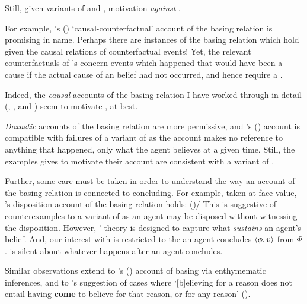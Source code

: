 \begin{note}
{    Still, given variants of \qWhy{} and \qHow{}, motivation \emph{against} \issueInclusion{}.

    For example, \citeauthor{Swain:1981wd}'s (\citeyear{Swain:1981wd}) `causal-counterfactual' account of the basing relation is promising in name.
    Perhaps there are instances of the basing relation which hold given the causal relations of counterfactual events!
    Yet, the relevant counterfactuals of \citeauthor{Swain:1981wd}'s concern events which happened that would have been a cause if the actual cause of an \agents{} belief had not occurred, and hence require a .

    Indeed, the \emph{causal} accounts of the basing relation I have worked through in detail (\cite{Moser:1989tv}, \cite{Ye:2020ux}, and \cite{Turri:2011aa}) seem to motivate \issueInclusion{}, at best.

    \emph{Doxastic} accounts of the basing relation are more permissive, and \citeauthor{Tolliver:1982us}'s (\citeyear{Tolliver:1982us}) account is compatible with failures of a variant of \issueInclusion{} as the account makes no reference to anything that happened, only what the agent believes at a given time.
    Still, the examples \citeauthor{Tolliver:1982us} gives to motivate their account are consistent with a variant of \issueInclusion{}.

    Further, some care must be taken in order to understand the way an account of the basing relation is connected to concluding.
    For example, taken at face value, \citeauthor{Evans:2013tw}'s disposition account of the basing relation holds:
     (\citeyear[2952]{Evans:2013tw})/
  This is suggestive of counterexamples to a variant of \issueInclusion{} as an agent may be disposed without witnessing the disposition.
  However, \citeauthor{Evans:2013tw}' theory is designed to capture what \emph{sustains} an agent's belief.%
  And, our interest with \issueInclusion{} is restricted to the  an agent concludes \(\langle\phi, v\rangle\) from \(\Phi\).
  \issueInclusion{} is silent about whatever happens after an agent concludes.

  Similar observations extend to \citeauthor{Moretti:2019wx}'s (\citeyear{Moretti:2019wx}) account of basing via enthymematic inferences, and to  \citeauthor{Audi:1986to}'s suggestion of cases where `[b]elieving for a reason does not entail having \textbf{come} to believe for that reason, or for any reason' (\citeyear[32--33]{Audi:1986to}).
  }
\end{note}


